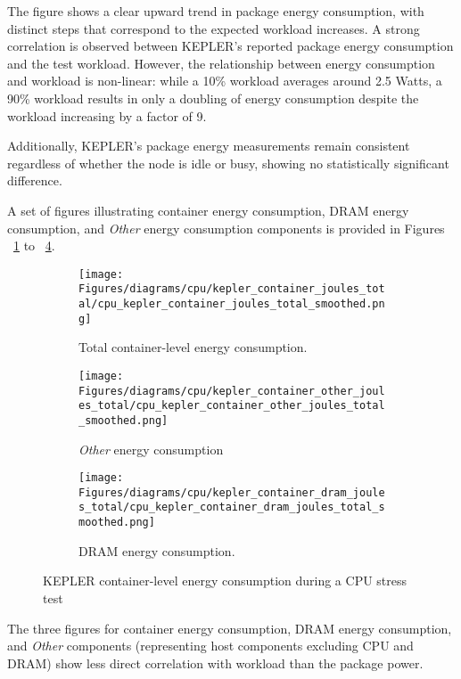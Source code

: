 The figure shows a clear upward trend in package energy consumption, with distinct steps that correspond to the expected workload increases. A strong correlation is observed between KEPLER's reported package energy consumption and the test workload. However, the relationship between energy consumption and workload is non-linear: while a 10\% workload averages around 2.5 Watts, a 90\% workload results in only a doubling of energy consumption despite the workload increasing by a factor of 9.

Additionally, KEPLER's package energy measurements remain consistent regardless of whether the node is idle or busy, showing no statistically significant difference.

A set of figures illustrating container energy consumption, DRAM energy consumption, and \textit{Other} energy consumption components is provided in Figures ~\ref{fig:cpu_kepler_container_joules_total} to ~\ref{fig:cpu_kepler_container_dram_joules_total}.

\begin{figure}[H]
    \centering
    \begin{subfigure}{1\textwidth}
        \texttt{[image: Figures/diagrams/cpu/kepler\_container\_joules\_total/cpu\_kepler\_container\_joules\_total\_smoothed.png]}
        \caption{Total container-level energy consumption.}
        \label{fig:cpu_kepler_container_joules_total}
    \end{subfigure}
    \begin{subfigure}{0.49\textwidth}
        \texttt{[image: Figures/diagrams/cpu/kepler\_container\_other\_joules\_total/cpu\_kepler\_container\_other\_joules\_total\_smoothed.png]}
        \caption{\textit{Other} energy consumption}
        \label{fig:cpu_kepler_container_other_joules_total}
    \end{subfigure}
    \begin{subfigure}{0.49\textwidth}
        \texttt{[image: Figures/diagrams/cpu/kepler\_container\_dram\_joules\_total/cpu\_kepler\_container\_dram\_joules\_total\_smoothed.png]}
        \caption{DRAM energy consumption.}
        \label{fig:cpu_kepler_container_dram_joules_total}
    \end{subfigure}
    \caption[Container-Level Energy Consumption]{KEPLER container-level energy consumption during a CPU stress test}
\end{figure}

The three figures for container energy consumption, DRAM energy consumption, and \textit{Other} components (representing host components excluding CPU and DRAM) show less direct correlation with workload than the package power. 

